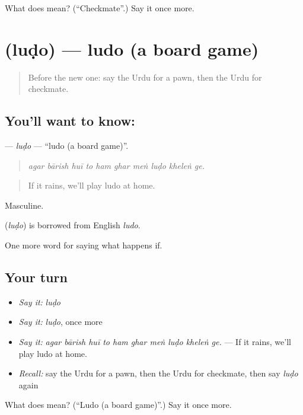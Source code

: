 \begin{tcolorbox}[breakable,colback=teal!4,colframe=teal!35!black,title={Before you move on}]
What does  mean? (\textquotedblleft{}Checkmate\textquotedblright{}.) Say it once more.
\end{tcolorbox}
\section[\texorpdfstring{\ur{لوڈو} (luḍo)}{لوڈو (luḍo)}]{ (luḍo) — ludo (a board game)}

\label{lesson:UR-C534-ludo}



\begin{quote}
Before the new one: say the Urdu for a pawn, then the Urdu for checkmate.
\end{quote}

\subsection*{You'll want to know: }
\textbf{} — \emph{luḍo} — \textquotedblleft{}ludo (a board game)\textquotedblright{}.

\begin{quote}
         
\end{quote}

\begin{quote}
\emph{agar bārish huī to ham ghar meṅ luḍo kheleṅ ge.}
\end{quote}

\begin{quote}
If it rains, we'll play ludo at home.
\end{quote}

Masculine.

\begin{cousinweb}
\textbf{} (\emph{luḍo}) is borrowed from English \emph{ludo}.
\end{cousinweb}

\begin{grammarlens}[title={What you've built}]
One more word for saying what happens if.
\end{grammarlens}

\subsection*{Your turn}
\begin{itemize}
\raggedright
  \item \emph{Say it:} \emph{luḍo}
  \item \emph{Say it:} \emph{luḍo}, once more
  \item \emph{Say it:} \emph{agar bārish huī to ham ghar meṅ luḍo kheleṅ ge.} — If it rains, we'll play ludo at home.
  \item \emph{Recall:} say the Urdu for a pawn, then the Urdu for checkmate, then say \emph{luḍo} again
\end{itemize}

\begin{tcolorbox}[breakable,colback=teal!4,colframe=teal!35!black,title={Before you move on}]
What does  mean? (\textquotedblleft{}Ludo (a board game)\textquotedblright{}.) Say it once more.
\end{tcolorbox}
